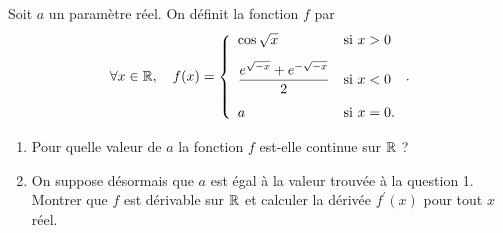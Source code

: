 \documentclass[a4paper, 11pt,reqno]{article}
\begin{document}
\begin{exercice}  \;
	Soit $a$ un param\`etre r\'eel. On d\'efinit la fonction $f$ par
	$$\forall x\in\R,\quad f(x)=\left\lbrace\begin{array}{ll} \cos{\sqrt{x}}                           & \hbox{si}\ x>0\vsec  \\
             \ddp\frac{e^{\sqrt{-x}}+e^{-\sqrt{-x}}   }{2} & \hbox{si}\  x<0\vsec \\ a & \hbox{si}\ x=0.\end{array}\right..$$
	\begin{enumerate}
		\item Pour quelle valeur de $a$ la fonction $f$ est-elle continue sur $\mathbb{R}$ ?
		\item On suppose d\'esormais que $a$ est \'egal \`a la valeur trouv\'ee \`a la question 1.\\
		      \noindent Montrer que $f$ est d\'erivable sur $\mathbb{R}$ et calculer la d\'eriv\'ee $f^{\prime}(x)$ pour tout $x$ r\'eel.
	\end{enumerate}
\end{exercice}
\end{document}
